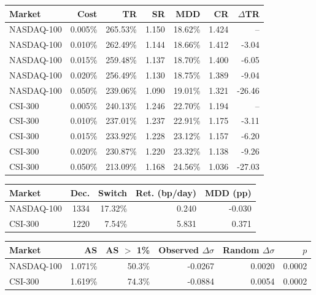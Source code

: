 \begin{tabular}{lrrrrrr}
\toprule
Market & Cost & TR & SR & MDD & CR & $\Delta$TR \\
\midrule
NASDAQ-100 & 0.005\% & 265.53\% & 1.150 & 18.62\% & 1.424 & -- \\
NASDAQ-100 & 0.010\% & 262.49\% & 1.144 & 18.66\% & 1.412 & -3.04 \\
NASDAQ-100 & 0.015\% & 259.48\% & 1.137 & 18.70\% & 1.400 & -6.05 \\
NASDAQ-100 & 0.020\% & 256.49\% & 1.130 & 18.75\% & 1.389 & -9.04 \\
NASDAQ-100 & 0.050\% & 239.06\% & 1.090 & 19.01\% & 1.321 & -26.46 \\
CSI-300 & 0.005\% & 240.13\% & 1.246 & 22.70\% & 1.194 & -- \\
CSI-300 & 0.010\% & 237.01\% & 1.237 & 22.91\% & 1.175 & -3.11 \\
CSI-300 & 0.015\% & 233.92\% & 1.228 & 23.12\% & 1.157 & -6.20 \\
CSI-300 & 0.020\% & 230.87\% & 1.220 & 23.32\% & 1.138 & -9.26 \\
CSI-300 & 0.050\% & 213.09\% & 1.168 & 24.56\% & 1.036 & -27.03 \\
\bottomrule
\end{tabular}

\begin{tabular}{lrrrr}
\toprule
Market & Dec. & Switch & Ret. (bp/day) & MDD (pp) \\
\midrule
NASDAQ-100 & 1334 & 17.32\% & 0.240 & -0.030 \\
CSI-300 & 1220 & 7.54\% & 5.831 & 0.371 \\
\bottomrule
\end{tabular}

\begin{tabular}{lrrrrr}
\toprule
Market & AS & AS $>$ 1\% & Observed $\Delta\sigma$ & Random $\Delta\sigma$ & $p$ \\
\midrule
NASDAQ-100 & 1.071\% & 50.3\% & -0.0267 & 0.0020 & 0.0002 \\
CSI-300 & 1.619\% & 74.3\% & -0.0884 & 0.0054 & 0.0002 \\
\bottomrule
\end{tabular}
